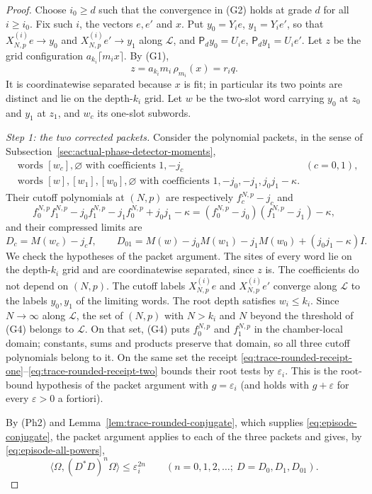 \begin{proof}
Choose $i_0\ge d$ such that the convergence in (G2) holds at grade $d$
for all $i\ge i_0$. Fix such $i$, the vectors $e,e'$ and $x$. Put
$y_0=Y_ie$, $y_1=Y_ie'$, so that
$X^{(i)}_{N,p}e\to y_0$ and $X^{(i)}_{N,p}e'\to y_1$ along
$\mathcal L$, and $\mathsf P_dy_0=U_ie$, $\mathsf P_dy_1=U_ie'$. Let $z$
be the grid configuration $a_{k_i}\lceil m_ix\rceil$. By (G1),
\[
 z=a_{k_i}m_i\,\rho_{m_i}(x)=r_iq .
\]
It is coordinatewise separated because $x$ is fit; in particular its
two points are distinct and lie on the depth-$k_i$ grid. Let $w$ be the
two-slot word carrying $y_0$ at $z_0$ and $y_1$ at $z_1$, and $w_c$ its
one-slot subwords.

\emph{Step 1: the two corrected packets.} Consider the polynomial
packets, in the sense of
Subsection~\ref{sec:actual-phase-detector-moments},
\begin{align*}
 &\text{words }[w_c],\varnothing\text{ with coefficients }1,-j_c
 &&(c=0,1),\\
 &\text{words }[w],[w_1],[w_0],\varnothing\text{ with coefficients }
 1,-j_0,-j_1,j_0j_1-\kappa .
\end{align*}
Their cutoff polynomials at $(N,p)$ are respectively $f_c^{N,p}-j_c$ and
\[
 f_0^{N,p}f_1^{N,p}-j_0f_1^{N,p}-j_1f_0^{N,p}+j_0j_1-\kappa
 =(f_0^{N,p}-j_0)(f_1^{N,p}-j_1)-\kappa ,
\]
and their compressed limits are
\[
 D_c=M(w_c)-j_cI,\qquad D_{01}=M(w)-j_0M(w_1)-j_1M(w_0)+(j_0j_1-\kappa)I .
\]
We check the hypotheses of the packet argument. The sites of every word
lie on the depth-$k_i$ grid and are coordinatewise separated, since $z$
is. The coefficients do not depend on $(N,p)$. The cutoff labels
$X^{(i)}_{N,p}e$ and $X^{(i)}_{N,p}e'$ converge along $\mathcal L$ to the
labels $y_0,y_1$ of the limiting words. The root depth satisfies
$w_i\le k_i$. Since $N\to\infty$ along $\mathcal L$, the set of $(N,p)$
with $N>k_i$ and $N$ beyond the threshold of (G4) belongs to
$\mathcal L$. On that set, (G4) puts $f_0^{N,p}$ and $f_1^{N,p}$ in the
chamber-local domain; constants, sums and products preserve that domain,
so all three cutoff polynomials belong to it. On the same set the receipt
\eqref{eq:trace-rounded-receipt-one}--\eqref{eq:trace-rounded-receipt-two}
bounds their root tests by $\varepsilon_i$. This is the root-bound
hypothesis of the packet argument with $g=\varepsilon_i$ (and holds with
$g+\varepsilon$ for every $\varepsilon>0$ a fortiori).

By (Ph2) and Lemma~\ref{lem:trace-rounded-conjugate}, which supplies
\eqref{eq:episode-conjugate}, the packet argument applies to each of the
three packets and gives, by \eqref{eq:episode-all-powers},
\[
 \langle\Omega,(D^*D)^n\Omega\rangle\le\varepsilon_i^{2n}
 \qquad(n=0,1,2,\ldots;\ D=D_0,D_1,D_{01}).
\]


\end{proof}

